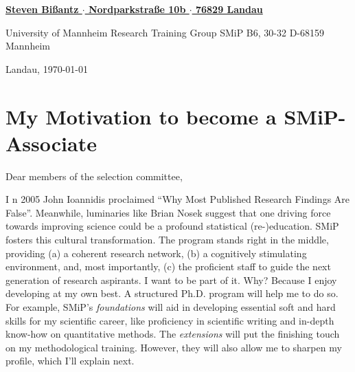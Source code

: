 \documentclass[11pt]{FreemanML}
\begin{document}
\begin{paracol}{2}

\switchcolumn %

\color{headings} 
\vspace{2cm}
\underline{\textbf{\footnotesize{Steven Bißantz $\cdot$ Nordparkstraße 10b $\cdot$ 76829 Landau}}}

\color{text}
\bigskip
\begin{leftbar}
University of Mannheim \newline
Research Training Group SMiP \newline
B6, 30-32 \newline
D-68159 Mannheim
\end{leftbar}

\switchcolumn

\vspace{5cm}
\begin{flushright}
Landau, \today
\end{flushright}
\end{paracol} %

\vspace{1cm}
\section*{My Motivation to become a SMiP-Associate}
\bigskip
Dear members of the selection committee,
\smallskip

\onehalfspacing

\lettrine[lines=3]{I}{} n 2005 John Ioannidis proclaimed \enquote{Why Most
Published Research Findings Are False}. Meanwhile, luminaries like Brian Nosek
suggest that one driving force towards improving science could be a profound
statistical (re-)education. SMiP fosters this cultural transformation. The
program stands right in the middle, providing (a) a coherent research network,
(b) a cognitively stimulating environment, and, most importantly, (c) the
proficient staff to guide the next generation of research aspirants. I want to
be part of it. Why? Because I enjoy developing at my own best. A structured
Ph.D. program will help me to do so. For example, SMiP's \textit{foundations}
will aid in developing essential soft and hard skills for my scientific career,
like proficiency in scientific writing and in-depth know-how on quantitative
methods. The \textit{extensions} will put the finishing touch on my
methodological training. However, they will also allow me to sharpen my
profile, which I'll explain next. 
\end{document}
